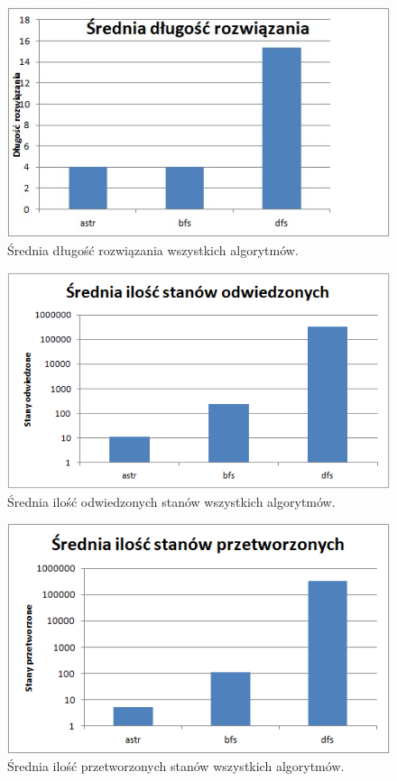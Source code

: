 \documentclass{classrep}
\begin{document}
\begin{figure}[H]
	\centering
		\includegraphics[width=1\textwidth]{Wykresy/16.jpg}
	\caption{Średnia długość rozwiązania wszystkich algorytmów.}
\end{figure}
\begin{figure}[H]
	\centering
		\includegraphics[width=1\textwidth]{Wykresy/17.png}
	\caption{Średnia ilość odwiedzonych stanów wszystkich algorytmów.}
\end{figure}
\begin{figure}[H]
	\centering
		\includegraphics[width=1\textwidth]{Wykresy/18.png}
	\caption{Średnia ilość przetworzonych stanów wszystkich algorytmów.}
\end{figure}
\end{document}
